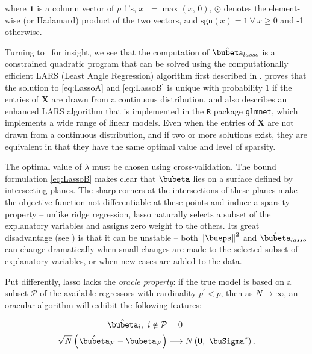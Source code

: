 \documentclass[graybox,envcountchap,sectrefs]{svmono}\usepackage[]{graphicx}\usepackage[]{xcolor}
\begin{document}
\begin{appendices}
where $\boldsymbol{1}$ is a column vector of $p$ 1's, $x^{+}=\max\left(x,\,0\right)$,
$\odot$ denotes the element-wise (or Hadamard) product of the two
vectors, and $\mathrm{sgn}\left(x\right)=1\ \forall\ x\geqslant0$
and -1 otherwise.

Turning to \ConstraintsAndPenaltiesChapter\ for insight, we see
that the computation of $\hat{\bubeta}_{lasso}$ is a constrained
quadratic program that can be solved using the computationally efficient
LARS (Least Angle Regression) algorithm first described in \citet{EfronHastieJohnstoneTibshirani2004}.
\citet{TibshiraniRyan2013} proves that the solution to \eqref{eq:LassoA}
and \eqref{eq:LassoB} is unique with probability 1 if the entries
of $\mathbf{X}$ are drawn from a continuous distribution, and also
describes an enhanced LARS algorithm that is implemented in the \texttt{R}
package \texttt{glmnet}, which implements a wide range of linear models.
Even when the entries of $\mathbf{X}$ are not drawn from a continuous
distribution, and if two or more solutions exist, they are equivalent
in that they have the same optimal value and level of sparsity.

The optimal value of $\lambda$ must be chosen using cross-validation.
The bound formulation \eqref{eq:LassoB} makes clear that $\bubeta$
lies on a surface defined by intersecting planes. The sharp corners
at the intersections of these planes make the objective function not
differentiable at these points and induce a sparsity property --
unlike ridge regression, lasso naturally selects a subset of the explanatory
variables and assigns zero weight to the others. Its great disadvantage
(see \citet{Breiman1996a}) is that it can be unstable -- both $\left\Vert \bueps\right\Vert ^{2}$
and $\hat{\bubeta}_{lasso}$ can change dramatically when small changes
are made to the selected subset of explanatory variables, or when
new cases are added to the data. 

Put differently, lasso lacks the \emph{oracle property}: if the true
model is based on a subset $\mathcal{P}$ of the available regressors
with cardinality $p^{\prime}<p$, then as $N\longrightarrow\infty$,
an oracular algorithm will exhibit the following features: 

\begin{subequations}
\begin{align}
\hat{\bubeta}_{i},\ i\notin\mathcal{P} & =0\label{eq:OracleLassoA}\\
\sqrt{N}\left(\hat{\bubeta}_{\mathcal{P}}-\bubeta_{\mathcal{P}}\right) & \longrightarrow N\left(\mathbf{0},\ \buSigma^{*}\right),\label{eq:OracleLassoB}
\end{align}
\end{subequations}


\end{appendices}
\end{document}

